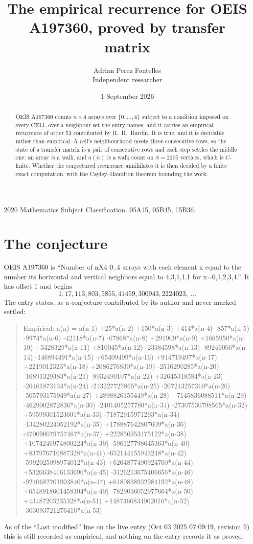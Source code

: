 \documentclass[11pt,a4paper]{article}
\title{The empirical recurrence for OEIS A197360, proved by transfer matrix}
\author{Adrian Perez Fontelles\\ \small Independent researcher}
\date{1 September 2026}
\theoremstyle{plain}
\theoremstyle{definition}
\begin{document}
\maketitle

\begin{abstract}
OEIS A197360 counts $n\times4$ arrays over $\{0,\dots,4\}$ subject to a condition imposed on
every CELL over a neighbour set the entry names, and it carries an empirical recurrence of
order $53$ contributed by R.~H.~Hardin. It is true, and it is decidable rather than
empirical. A cell's neighbourhood meets three consecutive rows, so the state of a transfer
matrix is a pair of consecutive rows and each step settles the middle one; an array is a
walk, and $a(n)$ is a walk count on $S=2205$ vertices, which is $C$-finite. Whether the
conjectured recurrence annihilates it is then decided by a finite exact computation, with the
Cayley--Hamilton theorem bounding the work.
\end{abstract}

\noindent\small 2020 Mathematics Subject Classification. 05A15, 05B45, 15B36.\normalsize

\section{The conjecture}

OEIS A197360 is ``Number of nX4 0..4 arrays with each element x equal to the number its horizontal and vertical neighbors equal to 4,3,1,1,1 for x=0,1,2,3,4.''. It has offset $1$ and begins
\[
1, 17, 113, 803, 5855, 41459, 300943, 2224023,\ \dots
\]
The entry states, as a conjecture contributed by its author and never marked settled:
\begin{quote}
Empirical: a(n) = a(n-1) +25*a(n-2) +150*a(n-3) +414*a(n-4) -857*a(n-5) -9974*a(n-6) -42118*a(n-7) -67868*a(n-8) +291909*a(n-9) +1665950*a(n-10) +3428329*a(n-11) +810045*a(n-12) -23384598*a(n-13) -89246066*a(n-14) -146894491*a(n-15) +65409499*a(n-16) +914719497*a(n-17) +2219012323*a(n-18) +2086276830*a(n-19) -2516290285*a(n-20) -16891329383*a(n-21) -8932490107*a(n-22) +32645318584*a(n-23) -26461873134*a(n-24) -213227725865*a(n-25) -207243257310*a(n-26) -505793175949*a(n-27) +2898826155449*a(n-28) +7145836088511*a(n-29) -4629002872836*a(n-30) -2401405257780*a(n-31) -27307530798565*a(n-32) +59599301523601*a(n-33) -71872915971293*a(n-34) -134280224052192*a(n-35) +178887642807609*a(n-36) -470090079757467*a(n-37) +222856953175122*a(n-38) +1074246974800224*a(n-39) -596127798645363*a(n-40) +837976716887328*a(n-41) -652144155943248*a(n-42) -5992025098974012*a(n-43) +6264877490924760*a(n-44) +5326638416133696*a(n-45) -3126213675406656*a(n-46) -9240682701903840*a(n-47) +6180838932984192*a(n-48) +6548918601458304*a(n-49) -7829036052977664*a(n-50) +43487203235328*a(n-51) +1487460834902016*a(n-52) -303093721276416*a(n-53)
\end{quote}
As of the ``Last modified'' line on the live entry (Oct 03 2025 07:09:19, revision 9) this is still
recorded as empirical, and nothing on the entry records it as proved.
\end{document}
